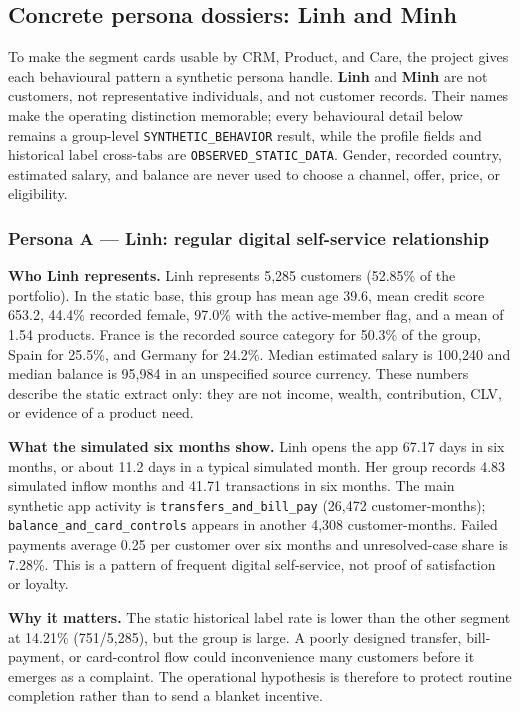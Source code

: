 \documentclass[a4paper,12pt]{article}
\newcommand{\observed}{\texttt{OBSERVED\_STATIC\_DATA}}
\newcommand{\synthetic}{\texttt{SYNTHETIC\_BEHAVIOR}}
\begin{document}
\subsection{Concrete persona dossiers: Linh and Minh}

To make the segment cards usable by CRM, Product, and Care, the project gives each behavioural pattern a synthetic persona handle. \textbf{Linh} and \textbf{Minh} are not customers, not representative individuals, and not customer records. Their names make the operating distinction memorable; every behavioural detail below remains a group-level \synthetic{} result, while the profile fields and historical label cross-tabs are \observed{}. Gender, recorded country, estimated salary, and balance are never used to choose a channel, offer, price, or eligibility.

\subsubsection{Persona A --- Linh: regular digital self-service relationship}

\textbf{Who Linh represents.} Linh represents 5,285 customers (52.85\% of the portfolio). In the static base, this group has mean age 39.6, mean credit score 653.2, 44.4\% recorded female, 97.0\% with the active-member flag, and a mean of 1.54 products. France is the recorded source category for 50.3\% of the group, Spain for 25.5\%, and Germany for 24.2\%. Median estimated salary is 100,240 and median balance is 95,984 in an unspecified source currency. These numbers describe the static extract only: they are not income, wealth, contribution, CLV, or evidence of a product need.

\textbf{What the simulated six months show.} Linh opens the app 67.17 days in six months, or about 11.2 days in a typical simulated month. Her group records 4.83 simulated inflow months and 41.71 transactions in six months. The main synthetic app activity is \texttt{transfers\_and\_bill\_pay} (26,472 customer-months); \texttt{balance\_and\_card\_controls} appears in another 4,308 customer-months. Failed payments average 0.25 per customer over six months and unresolved-case share is 7.28\%. This is a pattern of frequent digital self-service, not proof of satisfaction or loyalty.

\textbf{Why it matters.} The static historical label rate is lower than the other segment at 14.21\% (751/5,285), but the group is large. A poorly designed transfer, bill-payment, or card-control flow could inconvenience many customers before it emerges as a complaint. The operational hypothesis is therefore to protect routine completion rather than to send a blanket incentive.
\end{document}
